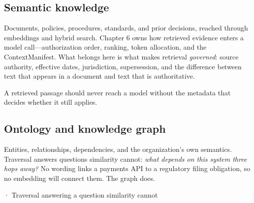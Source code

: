 \subsection{Semantic knowledge}

Documents, policies, procedures, standards, and prior decisions, reached through embeddings and hybrid search. Chapter 6 owns how retrieved evidence enters a model call—authorization order, ranking, token allocation, and the ContextManifest. What belongs here is what makes retrieval \emph{governed}: source authority, effective dates, jurisdiction, supersession, and the difference between text that appears in a document and text that is authoritative.\par

A retrieved passage should never reach a model without the metadata that decides whether it still applies.\par

\subsection{Ontology and knowledge graph}

Entities, relationships, dependencies, and the organization's own semantics. Traversal answers questions similarity cannot: \emph{what depends on this system three hops away?} No wording links a payments API to a regulatory filing obligation, so no embedding will connect them. The graph does.\par

\BookSnake · Traversal answering a question similarity cannot\par

